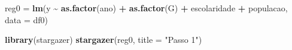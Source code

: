 \documentclass[portugues]{article}
\newenvironment{Shaded}{\begin{snugshade}}{\end{snugshade}}
\newcommand{\AttributeTok}[1]{\textcolor[rgb]{0.13,0.29,0.53}{#1}}
\newcommand{\FunctionTok}[1]{\textcolor[rgb]{0.13,0.29,0.53}{\textbf{#1}}}
\newcommand{\NormalTok}[1]{#1}
\newcommand{\OtherTok}[1]{\textcolor[rgb]{0.56,0.35,0.01}{#1}}
\newcommand{\SpecialCharTok}[1]{\textcolor[rgb]{0.81,0.36,0.00}{\textbf{#1}}}
\newcommand{\StringTok}[1]{\textcolor[rgb]{0.31,0.60,0.02}{#1}}
\begin{document}
\begin{box_code}

\begin{Shaded}
\begin{Highlighting}[]
    \NormalTok{reg0 }\OtherTok{=} \FunctionTok{lm}\NormalTok{(y }\SpecialCharTok{\textasciitilde{}} \FunctionTok{as.factor}\NormalTok{(ano) }\SpecialCharTok{+} \FunctionTok{as.factor}\NormalTok{(G) }
                    \SpecialCharTok{+}\NormalTok{ escolaridade }\SpecialCharTok{+}\NormalTok{ populacao, }
              \AttributeTok{data =}\NormalTok{ df0)}
    
    \FunctionTok{library}\NormalTok{(stargazer)}
    \FunctionTok{stargazer}\NormalTok{(reg0, }\AttributeTok{title =} \StringTok{"Passo 1"}\NormalTok{)}
\end{Highlighting}
\end{Shaded}


\end{box_code}
\end{document}

